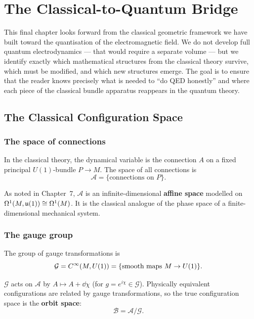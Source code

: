 \chapter{The Classical-to-Quantum Bridge}

This final chapter looks forward from the classical geometric framework we have built toward the quantisation of the electromagnetic field. We do not develop full quantum electrodynamics --- that would require a separate volume --- but we identify exactly which mathematical structures from the classical theory survive, which must be modified, and which new structures emerge. The goal is to ensure that the reader knows precisely what is needed to ``do QED honestly'' and where each piece of the classical bundle apparatus reappears in the quantum theory.

\section{The Classical Configuration Space}

\subsection{The space of connections}

In the classical theory, the dynamical variable is the connection $A$ on a fixed principal $U(1)$-bundle $P \to M$. The space of all connections is
\begin{equation}
\mathcal{A} = \{\text{connections on } P\}.
\end{equation}

As noted in Chapter~7, $\mathcal{A}$ is an infinite-dimensional \textbf{affine space} modelled on $\Omega^1(M, \mathfrak{u}(1)) \cong \Omega^1(M)$. It is the classical analogue of the phase space of a finite-dimensional mechanical system.

\subsection{The gauge group}

The group of gauge transformations is
\begin{equation}
\mathcal{G} = C^{\infty}(M, U(1)) = \{\text{smooth maps } M \to U(1)\}.
\end{equation}

$\mathcal{G}$ acts on $\mathcal{A}$ by $A \mapsto A + \dd\chi$ (for $g = e^{i\chi} \in \mathcal{G}$). Physically equivalent configurations are related by gauge transformations, so the true configuration space is the \textbf{orbit space}:
\begin{equation}
\mathcal{B} = \mathcal{A} / \mathcal{G}.
\end{equation}

